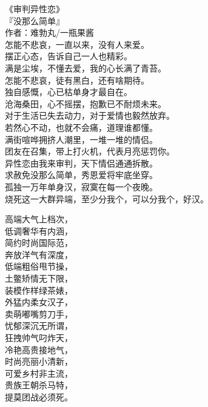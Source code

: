 \documentclass[cs4size,sub3section,UTF8,nofonts,SlantFont,fancyhdr,hyperref,fntef]{ctexart}\usepackage[]{graphicx}\usepackage[]{color}
\begin{document}
\rm
\begin{center}
《审判异性恋》\\
『没那么简单』\\
作者：难勃丸/一瓶果酱\\
怎能不悲哀，一直以来，没有人来爱。\\
摆正心态，告诉自己一人也精彩。\\
满是尘埃，不懂去爱，我的心长满了青苔。\\
怎能不悲哀，徒有黑白，还有啥期待。\\
独自感慨，心已枯单身才最自在。\\
沧海桑田，心不摇摆，抱歉已不耐烦未来。\\
对于生活已失去动力，对于爱情也毅然放弃。\\
若然心不动，也就不会痛，道理谁都懂。\\
满街喧哗拥挤人潮里，一堆一堆的情侣。\\
团友在召集，带上打火机，代表月亮惩罚你。\\
异性恋由我来审判，天下情侣通通拆散。\\
求赦免没那么简单，秀恩爱将牢底坐穿。\\
孤独一万年单身汉，寂寞在每一个夜晚。\\
烧死这一大群异端，至少分我个，可以分我个，好汉。
\end{center}

\HSS
\begin{center}
高端大气上档次，\\
低调奢华有内涵，\\
简约时尚国际范，\\
奔放洋气有深度，\\
低端粗俗甩节操，\\
土鳖矫情无下限，\\
装模作样绿茶婊，\\
外猛内柔女汉子，\\
卖萌嘟嘴剪刀手，\\
忧郁深沉无所谓，\\
狂拽帅气叼炸天，\\
冷艳高贵接地气，\\
时尚亮丽小清新，\\
可爱乡村非主流，\\
贵族王朝杀马特，\\
提莫团战必须死。
\end{center}
\end{document}
